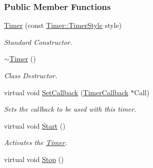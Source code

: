 \subsubsection*{Public Member Functions}
\begin{DoxyCompactItemize}
\item 
\hyperlink{classphys_1_1Timer_a25b70d2d45c5c56cce475841b7b18cd0}{Timer} (const \hyperlink{classphys_1_1Timer_a1ee86bf43e20329d750c5d582dcce329}{Timer::TimerStyle} style)
\begin{DoxyCompactList}\small\item\em Standard Constructor. \item\end{DoxyCompactList}\item 
\hypertarget{classphys_1_1Timer_ab96eede362c41f1ab56f1530cbae22b8}{
\hyperlink{classphys_1_1Timer_ab96eede362c41f1ab56f1530cbae22b8}{$\sim$Timer} ()}
\label{classphys_1_1Timer_ab96eede362c41f1ab56f1530cbae22b8}

\begin{DoxyCompactList}\small\item\em Class Destructor. \item\end{DoxyCompactList}\item 
virtual void \hyperlink{classphys_1_1Timer_a046ca4f7dcf2503e5993a18e11172f5e}{SetCallback} (\hyperlink{classphys_1_1TimerCallback}{TimerCallback} $\ast$Call)
\begin{DoxyCompactList}\small\item\em Sets the callback to be used with this timer. \item\end{DoxyCompactList}\item 
\hypertarget{classphys_1_1Timer_a2ec14a41cda7c31637351ab63f63304a}{
virtual void \hyperlink{classphys_1_1Timer_a2ec14a41cda7c31637351ab63f63304a}{Start} ()}
\label{classphys_1_1Timer_a2ec14a41cda7c31637351ab63f63304a}

\begin{DoxyCompactList}\small\item\em Activates the \hyperlink{classphys_1_1Timer}{Timer}. \item\end{DoxyCompactList}\item 
\hypertarget{classphys_1_1Timer_aa934478424678f84e8f4afb472eebbae}{
virtual void \hyperlink{classphys_1_1Timer_aa934478424678f84e8f4afb472eebbae}{Stop} ()}
\label{classphys_1_1Timer_aa934478424678f84e8f4afb472eebbae}


\end{DoxyCompactItemize}
